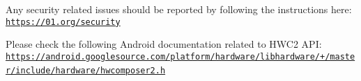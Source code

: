 Any security related issues should be reported by following the instructions here\+: \href{https://01.org/security}{\tt https\+://01.\+org/security}

Please check the following Android documentation related to H\+W\+C2 A\+PI\+: \href{https://android.googlesource.com/platform/hardware/libhardware/+/master/include/hardware/hwcomposer2.h}{\tt https\+://android.\+googlesource.\+com/platform/hardware/libhardware/+/master/include/hardware/hwcomposer2.\+h} ~\newline
 
